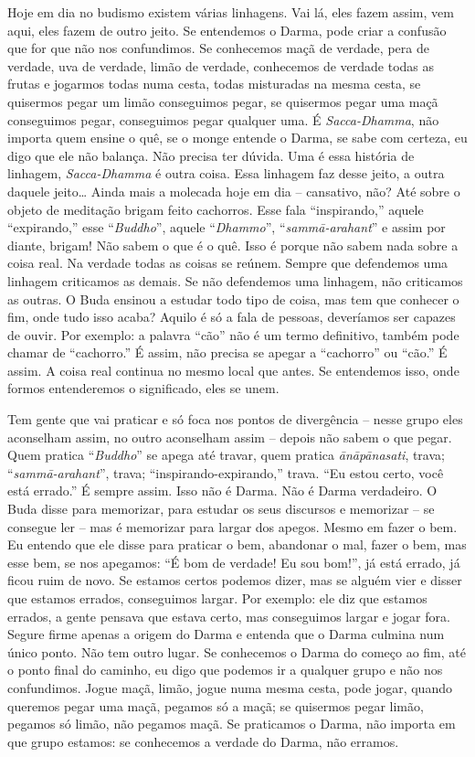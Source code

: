 Hoje em dia no budismo existem várias linhagens. Vai lá, eles fazem
assim, vem aqui, eles fazem de outro jeito. Se entendemos o Darma, pode
criar a confusão que for que não nos confundimos. Se conhecemos maçã de
verdade, pera de verdade, uva de verdade, limão de verdade, conhecemos
de verdade todas as frutas e jogarmos todas numa cesta, todas
misturadas na mesma cesta, se quisermos pegar um limão conseguimos
pegar, se quisermos pegar uma maçã conseguimos pegar, conseguimos pegar
qualquer uma. É \emph{Sacca-Dhamma}, não importa quem ensine o quê,
se o monge entende o Darma, se sabe com certeza, eu digo que ele não
balança. Não precisa ter dúvida. Uma é essa história de linhagem,
\emph{Sacca-Dhamma} é outra coisa. Essa linhagem faz desse jeito, a
outra daquele jeito\ldots{} Ainda mais a molecada hoje em dia – cansativo,
não? Até sobre o objeto de meditação brigam feito cachorros. Esse fala
“inspirando,” aquele “expirando,” esse “\emph{Buddho}”, aquele
“\emph{Dhammo}”, “\emph{sammā-arahant}” e assim por diante,
brigam! Não sabem o que é o quê. Isso é porque não sabem nada sobre a
coisa real. Na verdade todas as coisas se reúnem. Sempre que defendemos
uma linhagem criticamos as demais. Se não defendemos uma linhagem, não
criticamos as outras. O Buda ensinou a estudar todo tipo de coisa, mas
tem que conhecer o fim, onde tudo isso acaba? Aquilo é só a fala de
pessoas, deveríamos ser capazes de ouvir. Por exemplo: a palavra “cão”
não é um termo definitivo, também pode chamar de “cachorro.” É assim,
não precisa se apegar a “cachorro” ou “cão.” É assim. A coisa real
continua no mesmo local que antes. Se entendemos isso, onde formos
entenderemos o significado, eles se unem. 

Tem gente que vai praticar e só foca nos pontos de divergência –
nesse grupo eles aconselham assim, no outro aconselham assim – depois
não sabem o que pegar. Quem pratica “\emph{Buddho}” se apega até
travar, quem pratica \emph{ānāpānasati}, trava;
“\emph{sammā-arahant}”, trava; “inspirando-expirando,” trava. “Eu
estou certo, você está errado.” É sempre assim. Isso não é Darma. Não é
Darma verdadeiro. O Buda disse para memorizar, para estudar os seus
discursos e memorizar – se consegue ler – mas é memorizar para largar
dos apegos. Mesmo em fazer o bem. Eu entendo que ele disse para
praticar o bem, abandonar o mal, fazer o bem, mas esse bem, se nos
apegamos: “É bom de verdade! Eu sou bom!”, já está errado, já ficou
ruim de novo. Se estamos certos podemos dizer, mas se alguém vier e
disser que estamos errados, conseguimos largar. Por exemplo: ele diz
que estamos errados, a gente pensava que estava certo, mas conseguimos
largar e jogar fora. Segure firme apenas a origem do Darma e entenda
que o Darma culmina num único ponto. Não tem outro lugar. Se conhecemos
o Darma do começo ao fim, até o ponto final do caminho, eu digo que
podemos ir a qualquer grupo e não nos confundimos. Jogue maçã, limão,
jogue numa mesma cesta, pode jogar, quando queremos pegar uma maçã,
pegamos só a maçã; se quisermos pegar limão, pegamos só limão, não
pegamos maçã. Se praticamos o Darma, não importa em que grupo estamos:
se conhecemos a verdade do Darma, não erramos. 

